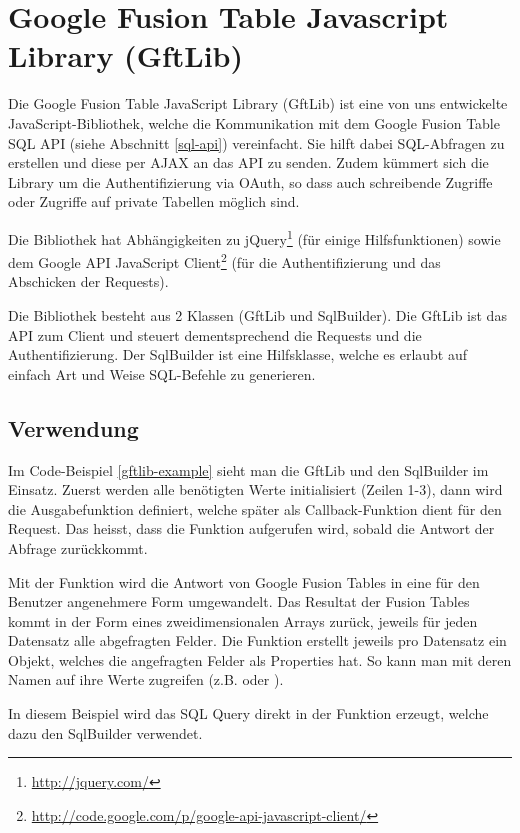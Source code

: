 \section{Google Fusion Table Javascript Library (GftLib)}
\label{gftlib-js}
Die Google Fusion Table JavaScript Library (GftLib) ist eine von uns entwickelte JavaScript-Bibliothek, welche die Kommunikation mit dem Google Fusion Table SQL \gls{API} (siehe Abschnitt \ref{sql-api}) vereinfacht. Sie hilft dabei SQL-Abfragen zu erstellen und diese per \gls{AJAX} an das \gls{API} zu senden. Zudem kümmert sich die Library um die Authentifizierung via \gls{OAuth}, so dass auch schreibende Zugriffe oder Zugriffe auf private Tabellen möglich sind.

Die Bibliothek hat Abhängigkeiten zu jQuery\footnote{\url{http://jquery.com/}} (für einige Hilfsfunktionen) sowie dem Google \gls{API} JavaScript Client\footnote{\url{http://code.google.com/p/google-api-javascript-client/}} (für die Authentifizierung und das Abschicken der Requests).

Die Bibliothek besteht aus 2 Klassen (GftLib und SqlBuilder). Die GftLib ist das \gls{API} zum Client und steuert dementsprechend die Requests und die Authentifizierung. Der SqlBuilder ist eine Hilfsklasse, welche es erlaubt auf einfach Art und Weise SQL-Befehle zu generieren.

\subsection{Verwendung}
Im Code-Beispiel \ref{gftlib-example} sieht man die GftLib und den SqlBuilder im Einsatz. Zuerst werden alle benötigten Werte initialisiert (Zeilen 1-3), dann wird die Ausgabefunktion  definiert, welche später als Callback-Funktion dient für den Request. Das heisst, dass die Funktion aufgerufen wird, sobald die Antwort der Abfrage zurückkommt. 

Mit der Funktion  wird die Antwort von Google Fusion Tables in eine für den Benutzer angenehmere Form umgewandelt. Das Resultat der Fusion Tables kommt in der Form eines zweidimensionalen Arrays zurück, jeweils für jeden Datensatz alle abgefragten Felder. Die Funktion erstellt jeweils pro Datensatz ein Objekt, welches die angefragten Felder als Properties hat. So kann man mit deren Namen auf ihre Werte zugreifen (z.B.  oder ).

In diesem Beispiel wird das SQL Query direkt in der Funktion  erzeugt, welche dazu den SqlBuilder verwendet.

